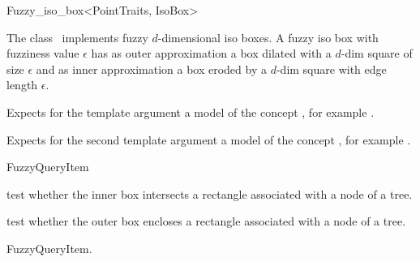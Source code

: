 

\begin{ccRefClass}{Fuzzy_iso_box<PointTraits, IsoBox>}  %


\ccDefinition
  
The class \ccRefName\ implements fuzzy $d$-dimensional iso boxes.
A fuzzy iso box with fuzziness value $\epsilon$ has
as outer approximation a box  dilated with a $d$-dim square of size $\epsilon$ and
as inner approximation a box eroded by a $d$-dim square with edge length $\epsilon$. 


\ccParameters
Expects for the template argument a model of the concept
, for example .

Expects for the second template argument  a model 
of the concept , for example .
 
\ccIsModel

FuzzyQueryItem

\ccTypes


\ccCreation
{}  %


\ccOperations


{test whether the inner box intersects a rectangle
associated with a node of a tree.}

{test whether the outer box encloses a rectangle
associated with a node of a tree.}

\ccSeeAlso

FuzzyQueryItem.

\end{ccRefClass}



